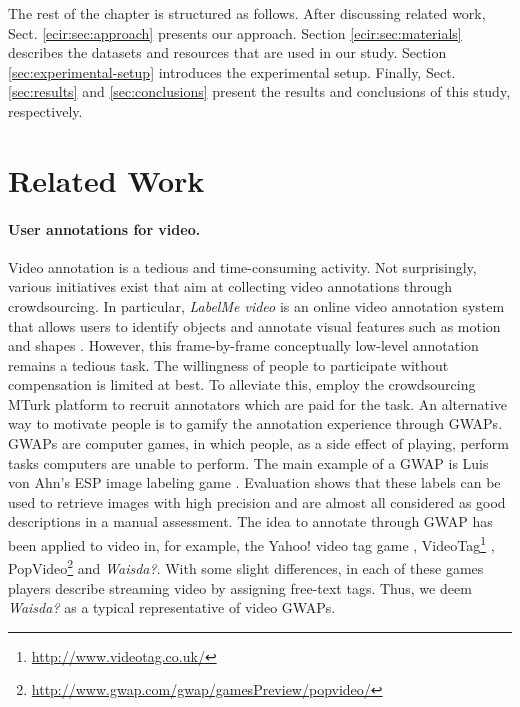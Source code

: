 The rest of the chapter is structured as follows.  After discussing related work, Sect. \ref{ecir:sec:approach} presents our approach. 
Section \ref{ecir:sec:materials} describes the datasets and resources that are used in our study. 
Section \ref{sec:experimental-setup} introduces the experimental setup. Finally, Sect. \ref{sec:results} and \ref{sec:conclusions} present the results and conclusions of this study, respectively.

\section{Related Work}\label{sec:related-work}
\paragraph{User annotations for video.}Video annotation is a tedious and time-consuming activity. Not surprisingly, various initiatives exist that aim at collecting video annotations through crowdsourcing. In particular, \textit{LabelMe video} is an online video annotation system that allows users to identify objects and annotate visual features such as motion and shapes \cite{labelme}. However, this frame-by-frame conceptually low-level annotation remains a tedious task. The willingness of people to participate without compensation is limited at best. To alleviate this, \cite{turk1,turk2} employ the crowdsourcing MTurk platform to recruit annotators which are paid for the task. An alternative way to motivate people is to gamify the annotation experience through GWAPs. GWAPs are computer games, in which people, as a side effect of playing, perform tasks computers are unable to perform. The main example of a GWAP is Luis von Ahn's ESP image labeling game \cite{CHI2004:vonAhn}. Evaluation shows that these labels can be used to retrieve images with high precision and are almost all considered as good descriptions in a manual assessment. The idea to annotate through GWAP has been applied to video in, for example, the Yahoo! video tag game \cite{WWW08_vanZwol_etal}, VideoTag\footnote{\url{http://www.videotag.co.uk/}} , PopVideo\footnote{\url{http://www.gwap.com/gwap/gamesPreview/popvideo/}} and \textit{Waisda?}. With some slight differences, in each of these games players describe streaming video by assigning free-text tags. Thus, we deem \textit{Waisda?} as a typical representative of video GWAPs. 
